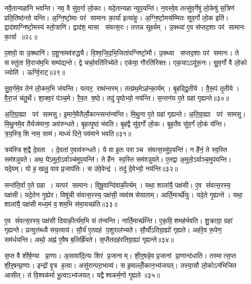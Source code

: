 नवै॒तान्यहा॑नि भवन्ति।
नव॒ वै सु॑व॒र्गा लो॒काः।
यदे॒तान्यहान्युप॒यन्ति॑।
न॒वस्वे॒व तत्सु॑व॒र्गेषु॑ लो॒केषु॑ स॒त्रिण॑ प्रति॒तिष्ठ॑न्तो यन्ति।
अ॒ग्नि॒ष्टो॒माः पर॑ सामानः का॒र्या॑ इत्या॑हुः।
अ॒ग्नि॒ष्टो॒मस॑म्मितः सुव॒र्गो लो॒क इति॑।
द्वाद॑शाग्निष्टो॒मस्य॑ स्तो॒त्राणि॑।
द्वाद॑श॒ मासा संवत्स॒रः।
तत्तन्न सूर्क्ष्यम्।
उ॒क्थ्या॑ ए॒व स॑प्तद॒शाः पर॑ सामानः का॒र्या॥२८॥

प॒शवो॒ वा उ॒क्थानि॑।
प॒शू॒नामव॑रुद्ध्यै।
वि॒श्व॒जि॒द॒भि॒जिता॑\-वग्निष्टो॒मौ।
उ॒क्थ्या सप्तद॒शाः पर॑ समानः।
ते सस्तु॑ता वि॒राज॑म॒भि सम्प॑द्यन्ते।
द्वे चर्चा॒वति॑रिच्येते।
एक॑या॒ गौरति॑रिक्तः।
एक॒याऽऽयु॑रू॒नः।
सु॒व॒र्गो वै लो॒को ज्योति॑।
ऊर्ग्वि॒राट्॥२९॥

सु॒व॒र्गमे॒व तेन॑ लो॒कम॒भि ज॑यन्ति।
यत्पर॒ राथ॑न्तरम्।
तत्प्र॑थ॒मेऽह॑न्का॒र्यम्।
बृ॒हद्द्वि॒तीये।
वै॒रू॒पं तृ॒तीये।
वै॒रा॒जं च॑तु॒र्थे।
शा॒क्व॒रं प॑ञ्च॒मे।
रै॒व॒त ष॒ष्ठे।
तदु॑ पृ॒ष्ठेभ्यो॒ नय॑न्ति।
स॒न्तन॑य ए॒ते ग्रहा॑ गृह्यन्ते॥३०॥

अ॒ति॒ग्रा॒ह्या पर॑ सामसु।
इ॒माने॒वैतैर्लो॒कान्त्सन्त॑न्वन्ति।
मि॒थु॒ना ए॒ते ग्रहा॑ गृह्यन्ते।
अ॒ति॒ग्रा॒ह्या पर॑ सामसु।
मि॒थु॒नमे॒व तैर्यज॑माना॒ अव॑रुन्धते।
बृ॒हत्पृ॒ष्ठं भ॑वति।
बृ॒हद्वै सु॑व॒र्गो लो॒कः।
बृ॒ह॒तैव सु॑व॒र्गं लो॒कं य॑न्ति।
त्र॒य॒स्त्रि॒शि  नाम॒ साम॑।
माध्यं॑ दिने॒ पव॑माने भवति॥३१॥

त्रय॑स्त्रिश॒द्वै दे॒वता।
दे॒वता॑ ए॒वाव॑रुन्धते।
ये वा इ॒तः पराञ्च संवत्स॒रमु॑प॒यन्ति॑।
न है॑नं॒ ते स्व॒स्ति सम॑श्ञुवते।
अथ॒ ये॑ऽमुतो॒ऽर्वाञ्च॑मुप॒यन्ति॑।
ते है॑न स्व॒स्ति सम॑श्ञुवते।
ए॒तद्वा अ॒मुतो॒ऽर्वाञ्च॒मुप॑यन्ति।
यदे॒वम्।
यो ह॒ खलु॒ वाव प्र॒जाप॑तिः।
स उ॑वे॒वेन्द्र॑।
तदु॑ दे॒वेभ्यो॒ नय॑न्ति॥३२॥\anuvakamend[का॒र्या॑ वि॒राड्गृ॑ह्यन्ते॒ पव॑माने भव॒तीन्द्र॒ एकं॑ च]

सन्त॑ति॒र्वा ए॒ते ग्रहा।
यत्पर॑ सामानः।
वि॒षू॒वान्दि॑वाकी॒र्त्यम्।
यथा॒ शाला॑यै॒ पक्ष॑सी।
ए॒व सं॑वत्स॒रस्य॒ पक्ष॑सी।
यदे॒तेन गृ॒ह्येर\sn{}।
विषू॑ची संवत्स॒रस्य॒ पक्ष॑सी॒ व्यव॑स्रसेयाताम्।
आर्ति॒मार्च्छे॑युः।
यदे॒ते गृ॒ह्यन्ते।
यथा॒ शाला॑यै॒ पक्ष॑सी मध्य॒मं व॒शम॒भि स॑मा॒यच्छ॑ति॥३३॥

ए॒व सं॑वत्स॒रस्य॒ पक्ष॑सी दिवाकी॒र्त्य॑म॒भि सं त॑न्वन्ति।
नार्ति॒मार्च्छ॑न्ति।
ए॒क॒वि॒शमह॑र्भवति।
शु॒क्राग्रा॒ ग्रहा॑ गृह्यन्ते।
प्रत्युत्त॑ब्ध्यै सय॒त्वाय॑।
सौ॒र्य॑ ए॒तदह॑ प॒शुराल॑भ्यते।
सौ॒र्यो॑ऽतिग्रा॒ह्यो॑ गृह्यते।
अह॑रे॒व रू॒पेण॒ सम॑र्धयन्ति।
अथो॒ अह्न॑ ए॒वैष ब॒लिर्ह्रि॑यते।
स॒प्तैतदह॑रतिग्रा॒ह्या॑ गृह्यन्ते॥३४॥

स॒प्त वै शी॑र्\mbox{}ष॒ण्या प्रा॒णाः।
अ॒सावा॑दि॒त्यः शिर॑ प्र॒जानाम्।
शी॒र्॒षन्ने॒व प्र॒जानां प्रा॒णान्द॑धाति।
तस्मात्स॒प्त शी॒र्॒षन्प्रा॒णाः।
इन्द्रो॑ वृ॒त्र ह॒त्वा।
असु॑रान्परा॒भाव्य॑।
स इ॒माल्लोँ॒कान॒भ्य॑जयत्।
तस्या॒सौ लो॒कोऽन॑भिजित आसीत्।
तं वि॒श्वक॑र्मा भू॒त्वाऽभ्य॑जयत्।
यद्वैश्वकर्म॒णो गृ॒ह्यते॥३५॥

